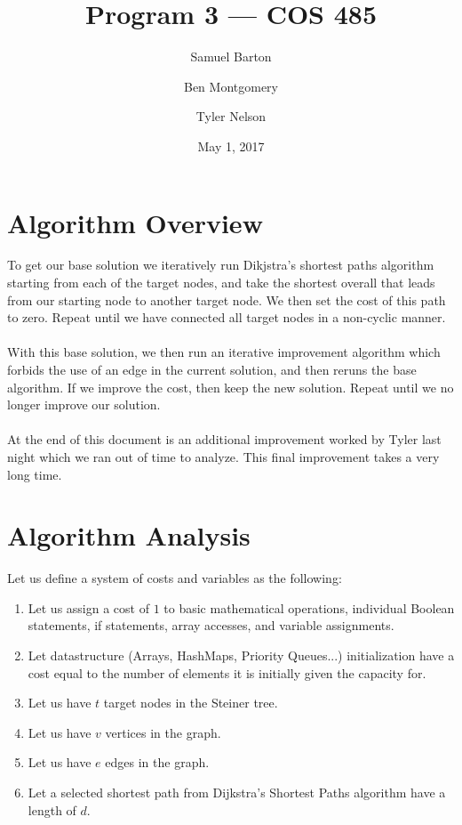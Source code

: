 \documentclass[12pt]{article}
\begin{document}
\title{Program 3 --- COS 485}
\author{Samuel Barton \and Ben Montgomery \and Tyler Nelson}
\date{May 1, 2017}
 
\maketitle
\section{Algorithm Overview}

To get our base solution
we iteratively run Dikjstra's shortest paths algorithm starting from each of the
target nodes, and take the shortest overall that leads from our starting node to
another target node. We then set the cost of this path to zero. Repeat until we
have connected all target nodes in a non-cyclic manner.
\\
\\
With this base solution, we then run an iterative improvement algorithm which 
forbids the use of an edge in the current solution, and then reruns the base
algorithm. If we improve the cost, then keep the new solution. Repeat until
we no longer improve our solution.
\\
\\
At the end of this document is an additional improvement worked by Tyler last
night which we ran out of time to analyze. This final improvement takes a very
long time.
\section{Algorithm Analysis}

Let us define a system of costs and variables as the following:
\begin{enumerate}
    \item Let us assign a cost of $1$ to basic mathematical operations, individual Boolean statements, if statements, array accesses, and variable assignments.
    \item Let datastructure (Arrays, HashMaps, Priority Queues...) initialization have a cost equal to the number of elements it is initially given the capacity for.
    \item Let us have $t$ target nodes in the Steiner tree.
    \item Let us have $v$ vertices in the graph.
    \item Let us have $e$ edges in the graph.
    \item Let a selected shortest path from Dijkstra's Shortest Paths algorithm have a length of $d$.
\end{enumerate}
\end{document}
